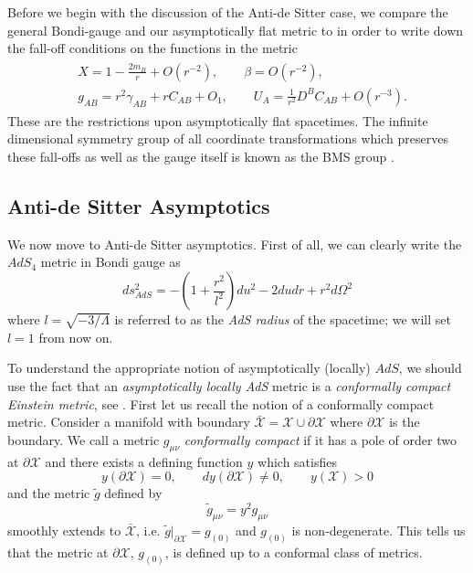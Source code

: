 \documentclass[a4paper,11pt]{article}
\numberwithin{equation}{section}
\begin{document}
Before we begin with the discussion of the Anti-de Sitter case, we compare the general Bondi-gauge and our asymptotically flat metric to in order to write down the fall-off conditions on the functions in the metric 
\begin{align}
\begin{split}
&X=1-\frac{2m_B}{r}+O(r^{-2}), \qquad \beta=O(r^{-2}), \\ 
&g_{AB}=r^2\gamma_{AB}+rC_{AB}+O_{1}, \qquad U_A=\frac{1}{r^2}D^{B}C_{AB}+O(r^{-3}).
\end{split}
\end{align}
These are the restrictions upon asymptotically flat spacetimes. The infinite dimensional symmetry group of all coordinate transformations which preserves these fall-offs as well as the gauge itself is known as the BMS group \cite{Sachs:1962zza}.

\subsection{Anti-de Sitter Asymptotics}  \label{subseq: AdS_asymptotics}

We now move to Anti-de Sitter asymptotics. First of all, we can clearly write the $AdS_4$ metric in Bondi gauge as 
\begin{equation}
ds_{AdS}^2=-\left(1+\frac{r^2}{l^2}\right)du^2-2dudr+r^2d\Omega^2
\end{equation}
where $l=\sqrt{-3/\Lambda}$ is referred to as the \textit{AdS radius} of the spacetime; we will set $l=1$ from now on. 

To understand the appropriate notion of asymptotically (locally) $AdS$, we should use the fact that an \textit{asymptotically locally AdS} metric is a \textit{conformally compact Einstein metric}, see  \cite{Skenderis:2002wp}. 
First let us recall the notion of a conformally compact metric. Consider a manifold with boundary $\bar{\mathcal{X}}=\mathcal{X} \cup \partial \mathcal{X}$ where $\partial \mathcal{X}$ is the boundary. We call a metric $g_{\mu \nu}$ \textit{conformally compact} if it has a pole of order two at $\partial \mathcal{X}$ and there exists a defining function $y$ which satisfies 
\begin{equation}
y(\partial \mathcal{X})=0, \qquad dy(\partial \mathcal{X}) \neq 0, \qquad y(\mathcal{X}) > 0  
\end{equation} 
and the metric $\tilde{g}$ defined by 
\begin{equation}
\tilde{g}_{\mu \nu}=y^2 g_{\mu \nu} 
 \label{eq: double_pole_metric}
\end{equation}
smoothly extends to $\bar{\mathcal{X}}$, i.e. $\tilde{g}|_{\partial \mathcal{X}}=g_{(0)}$ and $g_{(0)}$ is non-degenerate. This tells us that the metric at $\partial \mathcal{X}$, $g_{(0)}$, is defined up to a conformal class of metrics. \par
\end{document}
